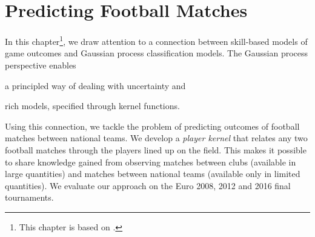 \chapter{Predicting Football Matches}
\label{ch:playerkern}

In this chapter\footnote{%
This chapter is based on \citet{maystre2016player}.},
we draw attention to a connection between skill-based models of game outcomes and Gaussian process classification models.
The Gaussian process perspective enables
\begin{enuminline}
\item a principled way of dealing with uncertainty and
\item rich models, specified through kernel functions.
\end{enuminline}
Using this connection, we tackle the problem of predicting outcomes of football matches between national teams.
We develop a \emph{player kernel} that relates any two football matches through the players lined up on the field.
This makes it possible to share knowledge gained from observing matches between clubs (available in large quantities) and matches between national teams (available only in limited quantities).
We evaluate our approach on the Euro 2008, 2012 and 2016 final tournaments.







